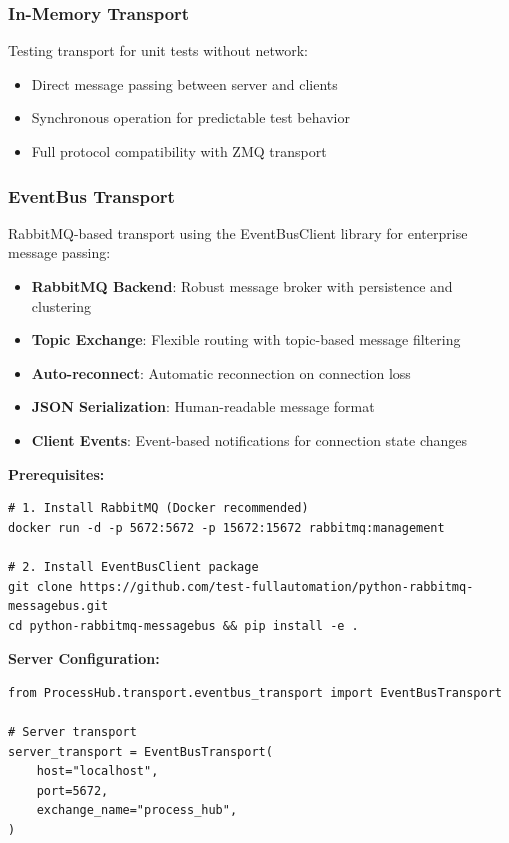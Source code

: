 \subsubsection{In-Memory Transport}

Testing transport for unit tests without network:

\begin{itemize}
   \item Direct message passing between server and clients
   \item Synchronous operation for predictable test behavior
   \item Full protocol compatibility with ZMQ transport
\end{itemize}

\subsubsection{EventBus Transport}

RabbitMQ-based transport using the EventBusClient library for enterprise message passing:

\begin{itemize}
   \item \textbf{RabbitMQ Backend}: Robust message broker with persistence and clustering
   \item \textbf{Topic Exchange}: Flexible routing with topic-based message filtering
   \item \textbf{Auto-reconnect}: Automatic reconnection on connection loss
   \item \textbf{JSON Serialization}: Human-readable message format
   \item \textbf{Client Events}: Event-based notifications for connection state changes
\end{itemize}

\textbf{Prerequisites:}

\begin{verbatim}
# 1. Install RabbitMQ (Docker recommended)
docker run -d -p 5672:5672 -p 15672:15672 rabbitmq:management

# 2. Install EventBusClient package
git clone https://github.com/test-fullautomation/python-rabbitmq-messagebus.git
cd python-rabbitmq-messagebus && pip install -e .
\end{verbatim}

\textbf{Server Configuration:}

\begin{verbatim}
from ProcessHub.transport.eventbus_transport import EventBusTransport

# Server transport
server_transport = EventBusTransport(
    host="localhost",
    port=5672,
    exchange_name="process_hub",
)
\end{verbatim}

